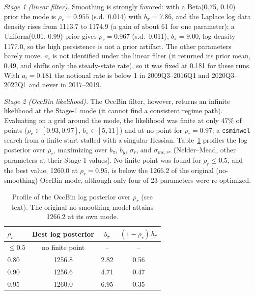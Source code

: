 \documentclass[11pt]{article}
\begin{document}
\emph{Stage 1 (linear filter).} Smoothing is strongly favored: with a
Beta(0.75, 0.10) prior the mode is $\rho_r=0.955$ (s.d.\ 0.014) with
$b_\pi=7.86$, and the Laplace log data density rises from 1113.7 to
1174.9 (a gain of about 61 for one parameter); a Uniform(0.01, 0.99)
prior gives $\rho_r=0.967$ (s.d.\ 0.011), $b_\pi=9.00$, log density
1177.0, so the high persistence is not a prior artifact. The other
parameters barely move. $a_i$ is not identified under the linear filter
(it returned its prior mean, 0.49, and shifts only the steady-state
rate), so it was fixed at 0.181 for these runs. With $a_i=0.181$ the
notional rate is below 1 in 2009Q3--2016Q1 and 2020Q3--2022Q1 and never in
2017--2019.

\emph{Stage 2 (OccBin likelihood).} The OccBin filter, however, returns an
infinite likelihood at the Stage-1 mode (it cannot find a consistent regime
path). Evaluating on a grid around the mode, the likelihood was finite at
only 47\% of points ($\rho_r\in[0.93,0.97]$, $b_\pi\in[5,11]$) and at no
point for $\rho_r=0.97$; a \texttt{csminwel} search from a finite start
stalled with a singular Hessian. Table~\ref{tab:smoothprof} profiles the
log posterior over $\rho_r$, maximizing over $b_\pi$, $b_y$, $\sigma_r$,
and $\sigma_{me,r^n}$ (Nelder--Mead, other parameters at their Stage-1
values). No finite point was found for $\rho_r\le0.5$, and the best value,
1260.0 at $\rho_r=0.95$, is below the 1266.2 of the original (no-smoothing)
OccBin mode, although only four of 23 parameters were re-optimized.

\begin{table}[ht]
\centering
\small
\begin{tabular}{@{}lccc@{}}
\toprule
$\rho_r$ & Best log posterior & $b_\pi$ & $(1-\rho_r)\,b_\pi$ \\
\midrule
$\le 0.5$ & no finite point & -- & -- \\
0.80 & 1256.8 & 2.82 & 0.56 \\
0.90 & 1256.6 & 4.71 & 0.47 \\
0.95 & 1260.0 & 6.95 & 0.35 \\
\bottomrule
\end{tabular}
\caption{Profile of the OccBin log posterior over $\rho_r$ (see text).
The original no-smoothing model attains 1266.2 at its own mode.}
\label{tab:smoothprof}
\end{table}
\end{document}
